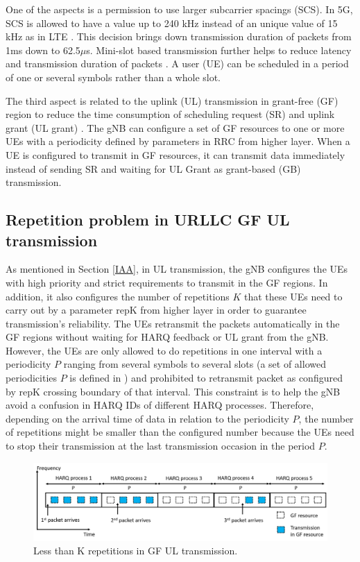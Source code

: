 \documentclass[conference]{IEEEtran}
\begin{document}
One of the aspects is a permission to use larger subcarrier spacings (SCS). In 5G, SCS is allowed to have a value up to 240 kHz instead of an unique value of 15 kHz as in LTE \cite{ad2}. This decision brings down transmission duration of packets from 1ms down to 62.5$\mu$s. Mini-slot based transmission further helps to reduce latency and transmission duration of packets \cite{ad3}. A user (UE) can be scheduled in a period of one or several symbols rather than a whole slot. 

The third aspect is related to the uplink (UL) transmission in grant-free (GF) region to reduce the time consumption of scheduling request (SR) and uplink grant (UL grant) \cite{ad4}. The gNB can configure a set of GF resources to one or more UEs with a periodicity defined by parameters in RRC from higher layer. When a UE is configured to transmit in GF resources, it can transmit data immediately instead of sending SR and waiting for UL Grant as grant-based (GB) transmission.

\subsection{Repetition problem in URLLC GF UL transmission}\label{IBB}
As mentioned in Section \ref{IAA}, in UL transmission, the gNB configures the UEs with high priority and strict requirements to transmit in the GF regions. In addition, it also configures the number of repetitions $K$ that these UEs need to carry out by a parameter repK from higher layer in order to guarantee transmission’s reliability. The UEs retransmit the packets automatically in the GF regions without waiting for HARQ feedback or UL grant from the gNB. However, the UEs are only allowed to do repetitions in one interval with a periodicity $P$ ranging from several symbols to several slots (a set of allowed periodicities $P$ is defined in \cite{ad5}) and prohibited to retransmit packet as configured by repK crossing boundary of that interval. This constraint is to help the gNB avoid a confusion in HARQ IDs of different HARQ processes. Therefore, depending on the arrival time of data in relation to the periodicity $P$, the number of repetitions might be smaller than the configured number because the UEs need to stop their transmission at the last transmission occasion in the period $P$.

\begin{figure}[htbp]
\centerline{\includegraphics[scale=0.27]{fig1.png}}
\caption{Less than K repetitions in GF UL transmission.}
\label{fig1}
\end{figure}
\end{document}
